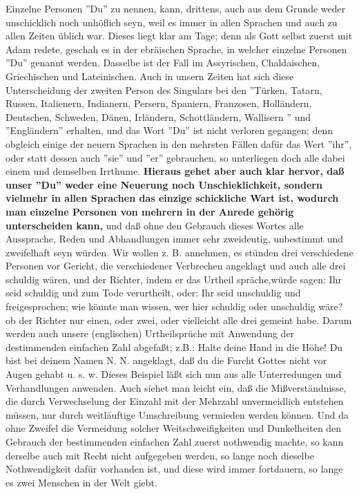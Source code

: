 Einzelne Personen ''Du'' zu nennen, kann, drittens, auch aus dem Grunde weder
unschicklich noch unhöflich seyn, weil es immer in allen Sprachen und auch zu
allen Zeiten üblich war. Dieses liegt klar am Tage; denn als Gott selbst zuerst
mit Adam redete, geschah es in der ebräischen Sprache, in welcher einzelne
Personen ''Du'' genannt werden. Dasselbe ist der Fall im Assyrischen,
Chaldaischen, Griechischen und Lateinischen. Auch in unsern Zeiten hat sich
diese Unterscheidung der zweiten Person des Singulars bei den ''Türken, Tatarn,
Russen, Italienern, Indianern, Persern, Spaniern, Franzosen, Holländern,
Deutschen, Schweden, Dänen, Irländern, Schottländern, Wallisern
'' und ''Engländern'' erhalten, und das Wort ''Du'' ist nicht verloren gegangen;
denn obgleich einige der neuern Sprachen in den mehrsten Fällen dafür das Wert
''ihr'', oder statt dessen auch ''sie'' und ''er'' gebrauchen, so unterliegen
doch alle dabei einem und demselben Irrthume. \textbf{Hieraus gehet aber auch klar
hervor, daß unser ''Du'' weder eine Neuerung noch Unschieklichkeit, sondern
vielmehr in allen Sprachen das einzige schickliche Wart ist, wodurch man
einzelne Personen von mehrern in der Anrede gehörig unterscheiden kann,} und daß
ohne den Gebrauch dieses Wortes alle Aussprache, Reden und Abhandlungen immer
sehr zweideutig, unbestimmt und zweifelhaft seyn würden. Wir wollen z. B.
annehmen, es stünden drei verschiedene Personen vor Gericht, die verschiedener
Verbrechen angeklagt und auch alle drei schuldig wären, und der Richter, indem
er das Urtheil spräche,würde sagen: Ihr seid schuldig und zum Tode verurtheilt,
oder: Ihr seid unschuldig und freigesprochen; wie könnte man wissen, wer hier
schuldig oder unschuldig wäre? ob der Richter nur einen, oder zwei, oder
vielleicht alle drei gemeint habe. Darum werden auch unsere (englischen)
Urtheilsprüche mit Anwendung der destimmenden einfachen Zahl abgefaßt; z.B.:
Halte deine Hand in die Höhe! Du bist bei deinem Namen N. N. angeklagt, daß du
die Furcht Gottes nicht vor Augen gehabt u. s. w. Dieses Beispiel läßt sich nun
aus alle Unterredungen und Verhandlungen anwenden. Auch siehet man leicht ein,
daß die Mißverständnisse, die durch Verwechselung der Einzahl mit der Mehrzahl
unvermeidlich entstehen müssen, nur durch weitläuftige Umschreibung vermieden
werden können. Und da ohne Zweifel die Vermeidung solcher Weitschweifigkeiten
und Dunkelheiten den Gebrauch der bestimmenden einfachen Zahl zuerst nothwendig
machte, so kann derselbe auch mit Recht nicht aufgegeben werden, so lange noch
dieselbe Nothwendigkeit dafür vorhanden ist, und diese wird immer fortdauern, so
lange es zwei Menschen in der Welt giebt.

